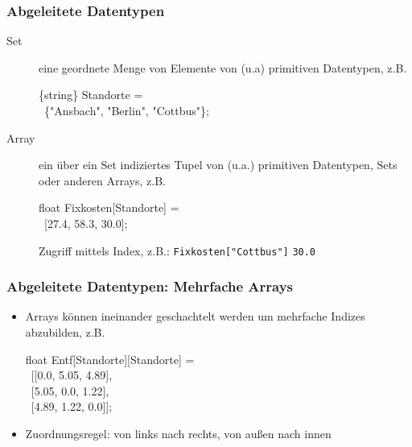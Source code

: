 \begin{frame}
 \frametitle{Abgeleitete Datentypen}
 \begin{description}
  \item[Set] eine geordnete Menge von Elemente von (u.a) primitiven Datentypen, z.B.
  \begin{flushleft}\ttfamily{}
  \{string\} Standorte =\\\ \{"Ansbach", "Berlin", "Cottbus"\};
  \end{flushleft}
  \item[Array] ein über ein Set indiziertes Tupel von (u.a.) primitiven Datentypen, Sets oder anderen Arrays, z.B.
  \begin{flushleft}\ttfamily{}
  float Fixkosten[Standorte] =\\\ [27.4, 58.3, 30.0];
  \end{flushleft}
  Zugriff mittels Index, z.B.: \texttt{Fixkosten["Cottbus"]} \textrightarrow{} \texttt{30.0}
 \end{description}
\end{frame}

\begin{frame}
 \frametitle{Abgeleitete Datentypen: Mehrfache Arrays}
 \begin{itemize}
  \item Arrays können ineinander geschachtelt werden um mehrfache Indizes abzubilden, z.B.
    \begin{flushleft}\ttfamily{}
      float Entf[Standorte][Standorte] =\\ 
      \ [[0.0, 5.05, 4.89],\\
      \ [5.05, 0.0, 1.22],\\
      \ [4.89, 1.22, 0.0]];
    \end{flushleft}
  \item Zuordnungsregel: von links nach rechts, von außen nach innen
 \end{itemize}
\end{frame}

